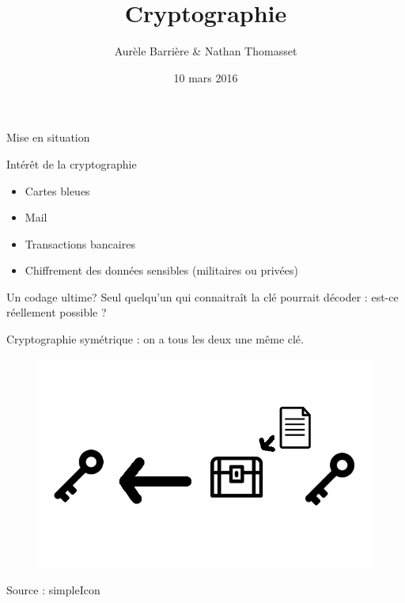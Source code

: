 \documentclass{beamer}
\author{Aurèle Barrière \& Nathan Thomasset}
\title{Cryptographie}
\date{10 mars 2016}
\begin{document}
\begin{frame}
\maketitle
\end{frame}

\begin{frame}{Mise en situation}
  \end{frame}

\begin{frame}{Intérêt de la cryptographie}
  \begin{itemize}
  \item Cartes bleues
    
  \item Mail
    
  \item Transactions bancaires
  
  \item Chiffrement des données sensibles (militaires ou privées)
\end{itemize}
\end{frame}

\begin{frame}{Un codage ultime?}
  Seul quelqu'un qui connaitraît la clé pourrait décoder : est-ce réellement possible ?

Cryptographie symétrique : on a tous les deux une même clé.
\begin{figure}
\centering
\includegraphics[scale = 0.4]{symetric.png}

\end{figure}
\footnotesize{Source : simpleIcon}
  \end{frame}
\end{document}
